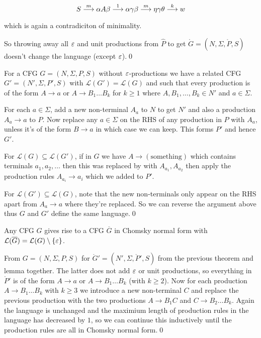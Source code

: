 \documentclass[tikx, border = 10pt]{article}
\begin{document}
\[
	S \overset{m}{\underset{}{\longrightarrow}} \alpha A\beta \overset{1}{\underset{}{\longrightarrow}}\alpha\gamma\beta\overset{m}{\underset{}{\longrightarrow}} \eta \gamma\theta \overset{k}{\underset{}{\longrightarrow}} w
\]
which is again a contradiciton of minimality. \par
So throwing away all $ \varepsilon $ and unit productions from $ \hat P $ to get $ \mathring G = (N,\Sigma, \mathring P, S) $ doesn't change the language (except $ \varepsilon $).\qed
\begin{lemma}
  For a CFG $ G = (N,\Sigma, P,S) $ without $ \varepsilon $-productions we have a related CFG $ G' = (N', \Sigma, P', S) $ with $ \mathcal L(G') = \mathcal L(G) $ and such that every production is of the form $ A\longrightarrow a $ or $ A\longrightarrow B_1\dots B_k $ for $ k\ge 1 $ where $ A,B_1,\dots, B_k\in N' $ and $ a\in \Sigma $.
\end{lemma}
\pf For each $ a\in \Sigma $, add a new non-terminal $ A_a $ to $ N $ to get $ N' $ and also a production $ A_a \longrightarrow a $ to $ P $. Now replace any $ a\in \Sigma $ on the RHS of any production in $ P $ with $ A_a $, unless it's of the form $ B\to a $ in which case we can keep. This forms $ P' $ and hence $ G' $.
\par
For $ \mathcal L(G)\subseteq \mathcal L(G') $, if in $ G $ we have $ A\longrightarrow (\text{something}) $ which contains terminals $ a_1, a_2, \dots $ then this was replaced by with $ A_{a_1},A_{a_2} $ then apply the production rules $ A_{a_i} \longrightarrow a_i $ which we added to $ P' $.\par
For $ \mathcal L(G')\subseteq \mathcal L(G) $, note that the new non-terminals only appear on the RHS apart from $ A_a \longrightarrow a $ where they're replaced. So we can reverse the argument above thus $ G $ and $ G' $ define the same language.\qed
\begin{theorem}
	Any CFG $ G $ gives rise to a CFG $ \overline G $ in Chomsky normal form with $ \mathcal L(\overline G) = \mathcal L(G) \setminus \{\varepsilon\} $.
\end{theorem}
\pf From $ G = (N, \Sigma, P, S) $ for $ \mathring G' = (N',\Sigma, \mathring P', S) $ from the previous theorem and lemma together. The latter does not add $ \varepsilon $ or unit productions, so everything in $ \mathring P' $ is of the form $ A\to a $ or $ A\to B_1\dots B_k $ (with $ k\ge 2 $). Now for each production $ A\to B_1\dots B_k $ with $ k\ge 3 $ we introduce a new non-terminal $ C $ and replace the previous production with the two productions $ A \to B_1C $ and $ C \to B_2\dots B_k $. Again the language is unchanged and the maximium length of production rules in the language has decreased by $ 1 $, so we can continue this inductively until the production rules are all in Chomsky normal form.\qed
\end{document}
